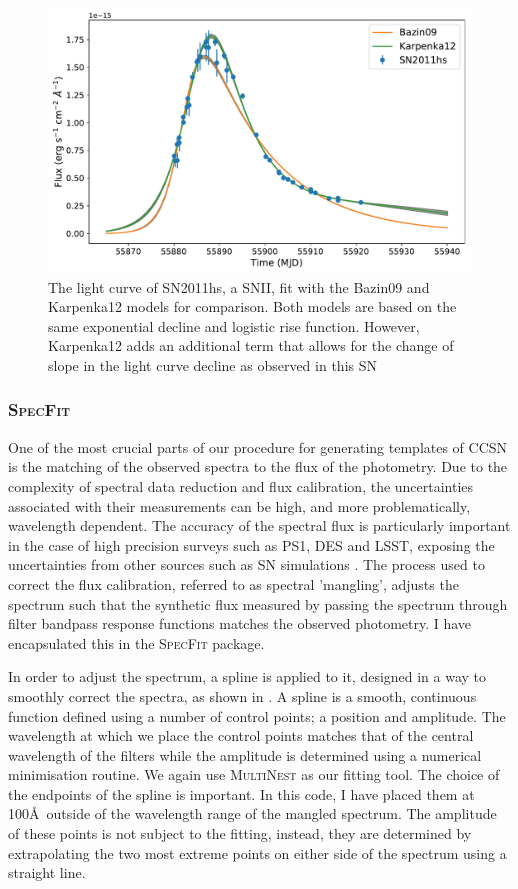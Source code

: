 \begin{figure}
  \centering
  \includegraphics[width=\textwidth]{Figures/Chapter3/CCModels}
  \caption{The light curve of SN2011hs, a SNII, fit with the Bazin09 and Karpenka12 models for comparison. Both models are based on the same exponential decline and logistic rise function. However, Karpenka12 adds an additional term that allows for the change of slope in the light curve decline as observed in this SN}
  \label{fig:CCSNModelFits}
\end{figure}

\subsubsection{\textsc{SpecFit}}
One of the most crucial parts of our procedure for generating templates of CCSN is the matching of the observed spectra to the flux of the photometry. Due to the complexity of spectral data reduction and flux calibration, the uncertainties associated with their measurements can be high, and more problematically, wavelength dependent. The accuracy of the spectral flux is particularly important in the case of high precision surveys such as PS1, DES and LSST, exposing the uncertainties from other sources such as SN simulations \citep{Jones2017}. The process used to correct the flux calibration, referred to as spectral 'mangling', adjusts the spectrum such that the synthetic flux measured by passing the spectrum through filter bandpass response functions matches the observed photometry. I have encapsulated this in the \textsc{SpecFit} package.

In order to adjust the spectrum, a spline is applied to it, designed in a way to smoothly correct the spectra, as shown in . A spline is a smooth, continuous function defined using a number of control points; a position and amplitude. The wavelength at which we place the control points matches that of the central wavelength of the filters while the amplitude is determined using a numerical minimisation routine. We again use \textsc{MultiNest} as our fitting tool. The choice of the endpoints of the spline is important. In this code, I have placed them at 100\AA~outside of the wavelength range of the mangled spectrum. The amplitude of these points is not subject to the fitting, instead, they are determined by extrapolating the two most extreme points on either side of the spectrum using a straight line.


